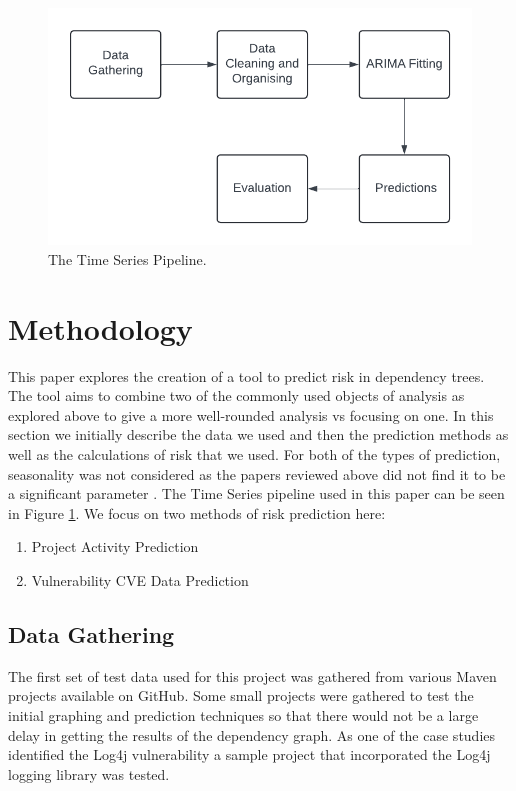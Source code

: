 \documentclass[conference]{IEEEtran}
\begin{document}
{\begin{figure}
\begin{center}
    \includegraphics[scale=0.5]{Pipeline.png}
    \caption{The Time Series Pipeline.}
    \label{fig:pipeline}
\end{center}
\end{figure}
\section{Methodology}
This paper explores the creation of a tool to predict risk in dependency trees. The tool aims to combine two of the commonly used objects of analysis as explored above to give a more well-rounded analysis vs focusing on one. In this section we initially describe the data we used and then the prediction methods as well as the calculations of risk that we used. For both of the types of prediction, seasonality was not considered as the papers reviewed above did not find it to be a significant parameter \cite{roumani_time_2015}. The Time Series pipeline used in this paper can be seen in Figure \ref{fig:pipeline}. We focus on two methods of risk prediction here: 
\begin{enumerate}
    \item Project Activity Prediction
    \item Vulnerability CVE Data Prediction
\end{enumerate}

\subsection{Data Gathering}
The first set of test data used for this project was gathered from various Maven projects available on GitHub. Some small projects were gathered to test the initial graphing and prediction techniques so that there would not be a large delay in getting the results of the dependency graph. As one of the case studies identified the Log4j vulnerability a sample project that incorporated the Log4j logging library was tested. 

}
\end{document}
